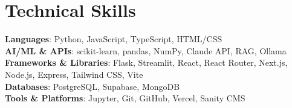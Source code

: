 \documentclass[letterpaper,10.5pt]{article}
\begin{document}
\section{Technical Skills}
 \begin{itemize}[leftmargin=0.15in, label={}]
    \normalsize{\item{
     \textbf{Languages}: Python, JavaScript, TypeScript, HTML/CSS \\
     \textbf{AI/ML \& APIs}: scikit-learn, pandas, NumPy, Claude API, RAG, Ollama \\
     \textbf{Frameworks \& Libraries}: Flask, Streamlit, React, React Router, Next.js, Node.js, Express, Tailwind CSS, Vite \\
     \textbf{Databases}: PostgreSQL, Supabase, MongoDB \\
     \textbf{Tools \& Platforms}: Jupyter, Git, GitHub, Vercel, Sanity CMS
    }}
 \end{itemize}
\end{document}
